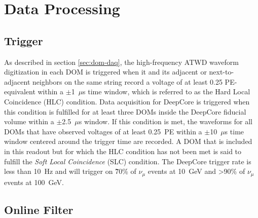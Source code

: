 \section{Data Processing}
\label{sec:data-processing}

\subsection{Trigger}
As described in section \ref{sec:dom-daq}, the high-frequency ATWD waveform digitization in each DOM is triggered when it and its adjacent or next-to-adjacent neighbors on the same string record a voltage of at least 0.25 PE-equivalent within a $\pm$1~$\mu$s time window, which is referred to as the Hard Local Coincidence (HLC) condition. Data acquisition for DeepCore is triggered when this condition is fulfilled for at least three DOMs inside the DeepCore fiducial volume within a $\pm$2.5~$\mu$s window. If this condition is met, the waveforms for all DOMs that have observed voltages of at least 0.25~PE within a $\pm$10~$\mu$s time window centered around the trigger time are recorded. A DOM that is included in this readout but for which the HLC condition has not been met is said to fulfill the \emph{Soft Local Coincidence} (SLC) condition. The DeepCore trigger rate is less than 10~Hz and will trigger on \~70\% of $\nu_\mu$ events at 10~GeV and >90\% of $\nu_\mu$ events at 100~GeV\cite{DeepCore}.

\subsection{Online Filter}

